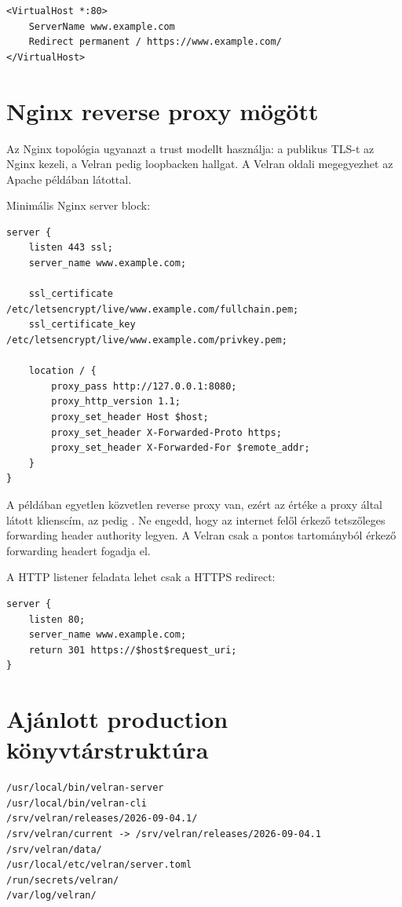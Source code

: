 \begin{lstlisting}
<VirtualHost *:80>
    ServerName www.example.com
    Redirect permanent / https://www.example.com/
</VirtualHost>
\end{lstlisting}

\section{Nginx reverse proxy mögött}

Az Nginx topológia ugyanazt a trust modellt használja: a publikus TLS-t az Nginx kezeli, a Velran pedig loopbacken hallgat. A Velran oldali  megegyezhet az Apache példában látottal.

Minimális Nginx server block:

\begin{lstlisting}
server {
    listen 443 ssl;
    server_name www.example.com;

    ssl_certificate     /etc/letsencrypt/live/www.example.com/fullchain.pem;
    ssl_certificate_key /etc/letsencrypt/live/www.example.com/privkey.pem;

    location / {
        proxy_pass http://127.0.0.1:8080;
        proxy_http_version 1.1;
        proxy_set_header Host $host;
        proxy_set_header X-Forwarded-Proto https;
        proxy_set_header X-Forwarded-For $remote_addr;
    }
}
\end{lstlisting}

A példában egyetlen közvetlen reverse proxy van, ezért az  értéke a proxy által látott klienscím, az  pedig . Ne engedd, hogy az internet felől érkező tetszőleges forwarding header authority legyen. A Velran csak a pontos  tartományból érkező forwarding headert fogadja el.

A HTTP listener feladata lehet csak a HTTPS redirect:

\begin{lstlisting}
server {
    listen 80;
    server_name www.example.com;
    return 301 https://$host$request_uri;
}
\end{lstlisting}

\section{Ajánlott production könyvtárstruktúra}

\begin{lstlisting}
/usr/local/bin/velran-server
/usr/local/bin/velran-cli
/srv/velran/releases/2026-09-04.1/
/srv/velran/current -> /srv/velran/releases/2026-09-04.1
/srv/velran/data/
/usr/local/etc/velran/server.toml
/run/secrets/velran/
/var/log/velran/
\end{lstlisting}

